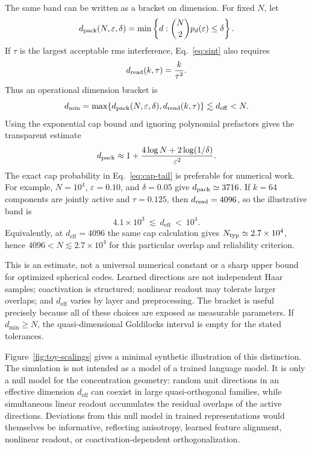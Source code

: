 \documentclass[
  aps,
  reprint,
  superscriptaddress,
  floatfix,
  nofootinbib,
  longbibliography
]{revtex4-2}
\newcommand{\deff}{d_{\mathrm{eff}}}
\begin{document}
The same band can be written as a bracket on dimension.  For fixed $N$, let
%
\begin{equation}
\label{eq:dpack}
d_{\rm pack}(N,\varepsilon,\delta)
=\min\left\{d:{N\choose2}p_d(\varepsilon)\leq\delta\right\}.
\end{equation}
%
If $\tau$ is the largest acceptable rms interference, Eq.~\eqref{eq:sint}
also requires
%
\begin{equation}
\label{eq:dread}
d_{\rm read}(k,\tau)=\frac{k}{\tau^2}.
\end{equation}
%
Thus an operational dimension bracket is
%
\begin{equation}
\label{eq:gold-fixed-n}
d_{\min}
=\max\{d_{\rm pack}(N,\varepsilon,\delta),d_{\rm read}(k,\tau)\}
\lesssim\deff<N.
\end{equation}
%
Using the exponential cap bound and ignoring polynomial prefactors gives the
transparent estimate
%
\begin{equation}
\label{eq:dpack-asymptotic}
d_{\rm pack}
\approx
1+\frac{4\log N+2\log(1/\delta)}{\varepsilon^2}.
\end{equation}
%
The exact cap probability in Eq.~\eqref{eq:cap-tail} is preferable for
numerical work.  For example, $N=10^4$, $\varepsilon=0.10$, and
$\delta=0.05$ give $d_{\rm pack}\simeq3716$.  If $k=64$ components are
jointly active and $\tau=0.125$, then $d_{\rm read}=4096$, so the illustrative
band is
%
\begin{equation}
\label{eq:gold-example}
4.1\times10^3\ \lesssim\ \deff\ <\ 10^4.
\end{equation}
%
Equivalently, at $\deff=4096$ the same cap calculation gives
$N_{\rm typ}\simeq2.7\times10^4$, hence
$4096<N\lesssim2.7\times10^4$ for this particular overlap and reliability
criterion.

This is an estimate, not a universal numerical constant or a sharp upper
bound for optimized spherical codes.  Learned directions are not independent
Haar samples; coactivation is structured; nonlinear readout may tolerate
larger overlaps; and $\deff$ varies by layer and preprocessing.  The bracket
is useful precisely because all of these choices are exposed as measurable
parameters.  If $d_{\min}\geq N$, the quasi-dimensional Goldilocks interval is
empty for the stated tolerances.

Figure~\ref{fig:toy-scalings} gives a minimal synthetic illustration of
this distinction. The simulation is not intended as a model of a trained
language model. It is only a null model for the concentration geometry:
random unit directions in an effective dimension $\deff$ can coexist in
large quasi-orthogonal families, while simultaneous linear readout
accumulates the residual overlaps of the active directions. Deviations
from this null model in trained representations would themselves be
informative, reflecting anisotropy, learned feature alignment, nonlinear
readout, or coactivation-dependent orthogonalization.
\end{document}
